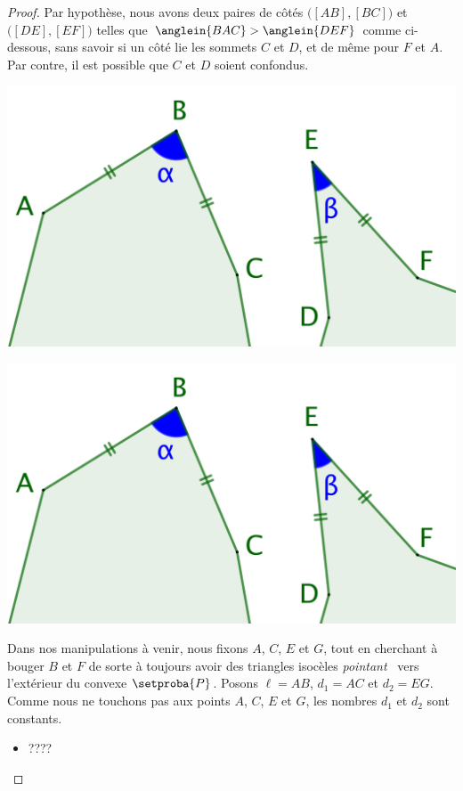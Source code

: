 \begin{proof}
	Par hypothèse, nous avons deux paires de côtés
	$\big( [AB] , [BC] \big)$ et
	$\big( [DE] , [EF] \big)$ telles que
	$\anglein{BAC} > \anglein{DEF}$ comme ci-dessous, sans savoir si un côté lie les sommets $C$ et $D$, et de même pour $F$ et $A$.
	Par contre, il est possible que $C$ et $D$ soient confondus.
	\begin{multicols}{2}
		\centering
		
		\includegraphics[scale=.4]{content/polygon/sol-is/2-eq-angles-start.png}
		
		\includegraphics[scale=.4]{content/polygon/sol-is/2-eq-angles-start.png}
	\end{multicols}
	
	
	
	\newpage
	




	
	Dans nos manipulations à venir, nous fixons $A$, $C$, $E$ et $G$, tout en cherchant à bouger $B$ et $F$ de sorte à toujours avoir des triangles isocèles \og \emph{pointant} \fg\ vers l'extérieur du convexe $\setproba{P}$.
	Posons $\ell = AB$, $d_1 = AC$ et $d_2 = EG$. Comme nous ne touchons pas aux points $A$, $C$, $E$ et $G$, les nombres $d_1$ et $d_2$ sont constants.
	\begin{itemize}
		\item ????


\end{itemize}
\end{proof}
